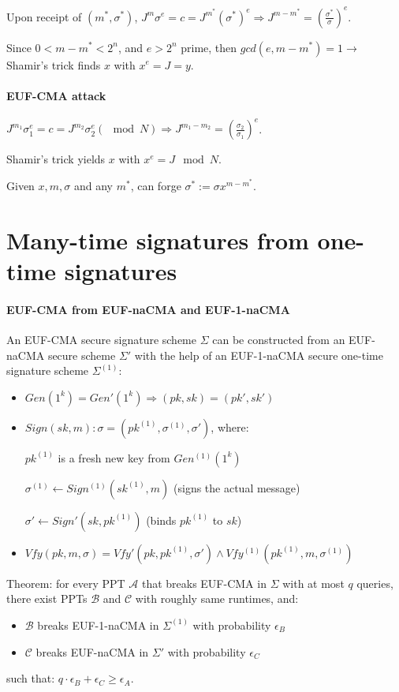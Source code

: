\documentclass[oneside]{book}
\newcommand{\cA}[0]{\mathcal{A}}
\newcommand{\cB}[0]{\mathcal{B}}
\newcommand{\cC}[0]{\mathcal{C}}
\begin{document}
Upon receipt of $(m^*, \sigma^*)$, $J^m\sigma^e = c = J^{m^*}(\sigma^*)^e \Rightarrow J^{m-m^*} = (\frac{\sigma^*}{\sigma})^e$.

Since $0 < m-m^* < 2^n$, and $e > 2^n$ prime, then $gcd(e, m-m^*) = 1 \rightarrow$ Shamir's trick finds $x$ with $x^e = J = y$.

\paragraph{EUF-CMA attack} $J^{m_1}\sigma_1^e = c = J^{m_2}\sigma_2^e (\mod N) \Rightarrow J^{m_1-m_2} = (\frac{\sigma_2}{\sigma_1})^e$.

Shamir's trick yields $x$ with $x^e = J \mod N$.

Given $x, m, \sigma$ and any $m^*$, can forge $\sigma^*:=\sigma x^{m-m^*}$.

\section{Many-time signatures from one-time signatures}

\paragraph{EUF-CMA from EUF-naCMA and EUF-1-naCMA} An EUF-CMA secure signature scheme $\Sigma$ can be constructed from an EUF-naCMA secure scheme $\Sigma'$ with the help of an EUF-1-naCMA secure one-time signature scheme $\Sigma^{(1)}$:
\begin{itemize}
    \item $Gen(1^k) = Gen'(1^k) \Rightarrow (pk, sk) = (pk', sk')$
    \item $Sign(sk, m): \sigma = (pk^{(1)}, \sigma^{(1)}, \sigma')$, where:
    
    $pk^{(1)}$ is a fresh new key from $Gen^{(1)}(1^k)$
    
    $\sigma^{(1)} \leftarrow Sign^{(1)}(sk^{(1)}, m)$ (signs the actual message)
    
    $\sigma' \leftarrow Sign'(sk, pk^{(1)})$ (binds $pk^{(1)}$ to $sk$)
    \item $Vfy(pk, m, \sigma) = Vfy'(pk, pk^{(1)}, \sigma') \land Vfy^{(1)}(pk^{(1)}, m, \sigma^{(1)})$
\end{itemize}

Theorem: for every PPT $\cA$ that breaks EUF-CMA in $\Sigma$ with at most $q$ queries, there exist PPTs $\cB$ and $\cC$ with roughly same runtimes, and:
\begin{itemize}
    \item $\cB$ breaks EUF-1-naCMA in $\Sigma^{(1)}$ with probability $\epsilon_B$
    \item $\cC$ breaks EUF-naCMA in $\Sigma'$ with probability $\epsilon_C$
\end{itemize}
such that: $q \cdot \epsilon_B + \epsilon_C \ge \epsilon_A$.
\end{document}
